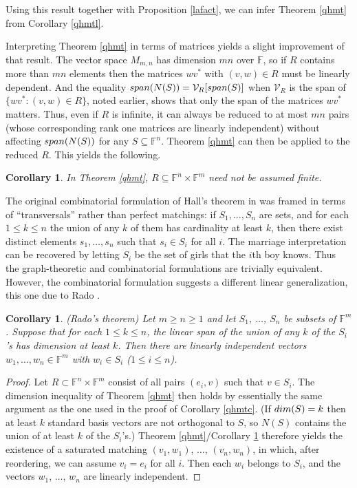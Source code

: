 \documentclass[10pt,a4paper]{amsart}
\newtheorem{cor}[thm]{Corollary}
\begin{document}
Using this result together with Proposition \ref{lafact}, we can infer Theorem \ref{qhmt} from Corollary \ref{qhmtl}.

Interpreting Theorem \ref{qhmt} in terms of matrices yields a slight improvement of that result. The vector space $M_{m,n}$ has dimension $mn$ over $\mathbb{F}$, so if $R$ contains more than $mn$ elements then the matrices $wv^*$ with $(v,w) \in R$ must be linearly dependent. And the equality ${\rm span}(N(S)) = \mathcal{V}_R[{\rm span}(S)]$ when $\mathcal{V}_R$ is the span of $\{wv^*: (v,w) \in R\}$, noted earlier, shows that only the span of the matrices $wv^*$ matters. Thus, even if $R$ is infinite, it can always be reduced to at most $mn$ pairs (whose corresponding rank one matrices are linearly independent) without affecting ${\rm span}(N(S))$ for any $S \subseteq \mathbb{F}^n$. Theorem \ref{qhmt} can then be applied to the reduced $R$. This yields the following.

\begin{cor}\label{imp}
In Theorem \ref{qhmt}, $R \subseteq \mathbb{F}^n\times \mathbb{F}^m$ need not be assumed finite.
\end{cor}

The original combinatorial formulation of Hall's theorem in \cite{hall} was framed in terms of ``transversals'' rather than perfect matchings: if $S_1, \ldots, S_n$ are sets, and for each $1 \leq k \leq n$ the union of any $k$ of them has cardinality at least $k$, then there exist distinct elements $s_1, \ldots, s_n$ such that $s_i \in S_i$ for all $i$. The marriage interpretation can be recovered by letting $S_i$ be the set of girls that the $i$th boy knows. Thus the graph-theoretic and combinatorial formulations are trivially equivalent. However, the combinatorial formulation suggests a different linear generalization, this one due to Rado \cite[Theorem 1]{rado}.

\begin{cor}\label{qhmtr} (Rado's theorem)
Let $m \geq n \geq 1$ and let $S_1$, $\ldots$, $S_n$ be subsets of $\mathbb{F}^m$. Suppose that for each $1 \leq k \leq n$, the linear span of the union of any $k$ of the $S_i$'s has dimension at least $k$. Then there are linearly independent vectors $w_1, \ldots, w_n \in \mathbb{F}^m$ with $w_i \in S_i$ ($1 \leq i \leq n$).
\end{cor}

\begin{proof}
Let $R \subset \mathbb{F}^n\times \mathbb{F}^m$ consist of all pairs $(e_i, v)$ such that $v \in S_i$. The dimension inequality of Theorem \ref{qhmt} then holds by essentially the same argument as the one used in the proof of Corollary \ref{qhmtc}. (If ${\rm dim}(S) = k$ then at least $k$ standard basis vectors are not orthogonal to $S$, so $N(S)$ contains the union of at least $k$ of the $S_i$'s.) Theorem \ref{qhmt}/Corollary \ref{imp} therefore yields the existence of a saturated matching $(v_1, w_1)$, $\ldots$, $(v_n,w_n)$, in which, after reordering, we can assume $v_i = e_i$ for all $i$. Then each $w_i$ belongs to $S_i$, and the vectors $w_1$, $\ldots$, $w_n$ are linearly independent.
\end{proof}
\end{document}
